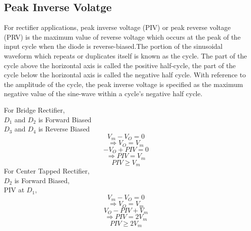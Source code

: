 		\subsection{Peak Inverse Volatge}
			For rectifier applications, peak inverse voltage (PIV) or peak reverse voltage (PRV) is the maximum value of reverse voltage which occurs at the peak of the input cycle when the diode is reverse-biased.The portion of the sinusoidal waveform which repeats or duplicates itself is known as the cycle. The part of the cycle above the horizontal axis is called the positive half-cycle, the part of the cycle below the horizontal axis is called the negative half cycle. With reference to the amplitude of the cycle, the peak inverse voltage is specified as the maximum negative value of the sine-wave within a cycle's negative half cycle.
			
			For Bridge Rectifier,\\
			\(D_1\) and \(D_2\) is Forward Biased\\
			\(D_3\) and \(D_4\) is Reverse Biased\\
			$$ V_m-V_O=0$$
			$$\Rightarrow V_O=V_m$$
			$$- V_O+PIV=0$$
			$$\Rightarrow PIV=V_m$$
			$$PIV \geq V_m$$
			For Center Tapped Rectifier,\\
			\(D_2\) is Forward Biased,\\
			PIV at \(D_1\), $$ V_m-V_O=0$$
			$$\Rightarrow V_O=V_m$$
			$$V_O-PIV+V_m$$
			$$\Rightarrow PIV=2V_m$$
			$$PIV \geq 2V_m$$
		
